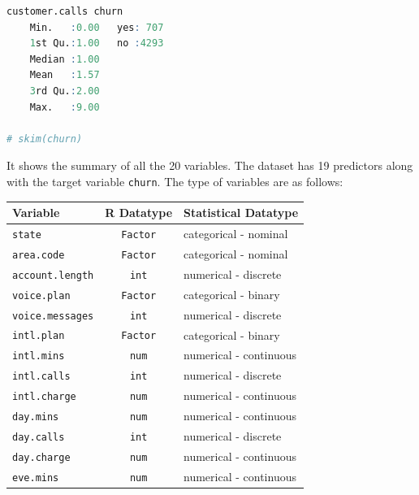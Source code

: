 \documentclass[
]{book}
\newcommand{\passthrough}[1]{#1}
\theoremstyle{definition}
\theoremstyle{definition}
\theoremstyle{definition}
\theoremstyle{definition}
\theoremstyle{remark}
\begin{document}
\begin{lstlisting}[language=R]
    customer.calls churn     
    Min.   :0.00   yes: 707  
    1st Qu.:1.00   no :4293  
    Median :1.00             
    Mean   :1.57             
    3rd Qu.:2.00             
    Max.   :9.00             
   
# skim(churn)
\end{lstlisting}

It shows the summary of all the 20 variables. The dataset has 19 predictors along with the target variable \passthrough{\lstinline!churn!}. The type of variables are as follows:

\begin{longtable}[]{@{}lcl@{}}
\toprule\noalign{}
Variable & R Datatype & Statistical Datatype \\
\midrule\noalign{}
\endhead
\bottomrule\noalign{}
\endlastfoot
\passthrough{\lstinline!state!} & \passthrough{\lstinline!Factor!} & categorical - nominal \\
\passthrough{\lstinline!area.code!} & \passthrough{\lstinline!Factor!} & categorical - nominal \\
\passthrough{\lstinline!account.length!} & \passthrough{\lstinline!int!} & numerical - discrete \\
\passthrough{\lstinline!voice.plan!} & \passthrough{\lstinline!Factor!} & categorical - binary \\
\passthrough{\lstinline!voice.messages!} & \passthrough{\lstinline!int!} & numerical - discrete \\
\passthrough{\lstinline!intl.plan!} & \passthrough{\lstinline!Factor!} & categorical - binary \\
\passthrough{\lstinline!intl.mins!} & \passthrough{\lstinline!num!} & numerical - continuous \\
\passthrough{\lstinline!intl.calls!} & \passthrough{\lstinline!int!} & numerical - discrete \\
\passthrough{\lstinline!intl.charge!} & \passthrough{\lstinline!num!} & numerical - continuous \\
\passthrough{\lstinline!day.mins!} & \passthrough{\lstinline!num!} & numerical - continuous \\
\passthrough{\lstinline!day.calls!} & \passthrough{\lstinline!int!} & numerical - discrete \\
\passthrough{\lstinline!day.charge!} & \passthrough{\lstinline!num!} & numerical - continuous \\
\passthrough{\lstinline!eve.mins!} & \passthrough{\lstinline!num!} & numerical - continuous \\

\end{longtable}
\end{document}
